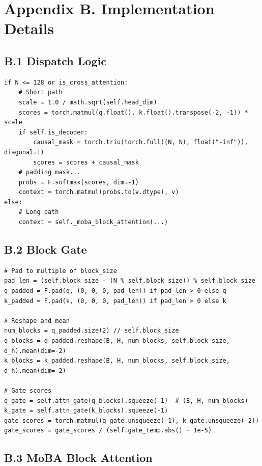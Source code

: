 \section{Appendix B. Implementation Details}

\subsection{B.1 Dispatch Logic}

\begin{lstlisting}
if N <= 128 or is_cross_attention:
    # Short path
    scale = 1.0 / math.sqrt(self.head_dim)
    scores = torch.matmul(q.float(), k.float().transpose(-2, -1)) * scale
    if self.is_decoder:
        causal_mask = torch.triu(torch.full((N, N), float("-inf")), diagonal=1)
        scores = scores + causal_mask
    # padding mask...
    probs = F.softmax(scores, dim=-1)
    context = torch.matmul(probs.to(v.dtype), v)
else:
    # Long path
    context = self._moba_block_attention(...)
\end{lstlisting}

\subsection{B.2 Block Gate}

\begin{lstlisting}
# Pad to multiple of block_size
pad_len = (self.block_size - (N % self.block_size)) % self.block_size
q_padded = F.pad(q, (0, 0, 0, pad_len)) if pad_len > 0 else q
k_padded = F.pad(k, (0, 0, 0, pad_len)) if pad_len > 0 else k

# Reshape and mean
num_blocks = q_padded.size(2) // self.block_size
q_blocks = q_padded.reshape(B, H, num_blocks, self.block_size, d_h).mean(dim=-2)
k_blocks = k_padded.reshape(B, H, num_blocks, self.block_size, d_h).mean(dim=-2)

# Gate scores
q_gate = self.attn_gate(q_blocks).squeeze(-1)  # (B, H, num_blocks)
k_gate = self.attn_gate(k_blocks).squeeze(-1)
gate_scores = torch.matmul(q_gate.unsqueeze(-1), k_gate.unsqueeze(-2))
gate_scores = gate_scores / (self.gate_temp.abs() + 1e-5)
\end{lstlisting}

\subsection{B.3 MoBA Block Attention}

